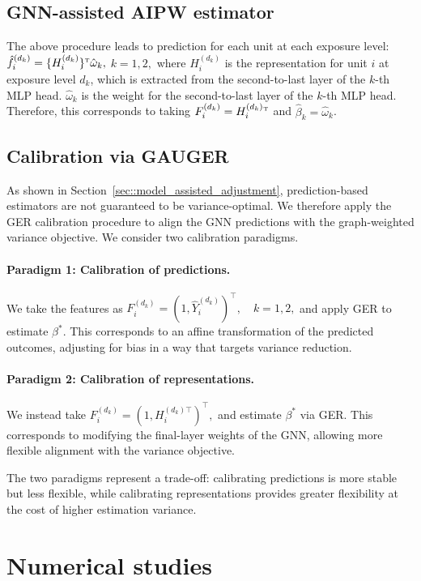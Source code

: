 \documentclass{article}
\theoremstyle{plain}
\theoremstyle{definition}
\theoremstyle{remark}
\def\T{{\textsc{t}}}
\begin{document}
\subsection{GNN-assisted AIPW estimator}
The above procedure leads to prediction for each unit at each exposure level: $\hat{f}_i^{(d_k)} = \{H_i^{(d_k)}\}{}^\T \hat{\omega}_k,$ $k=1,2,$ 
where $H_i^{(d_k)}$ is the representation for unit $i$ at exposure level $d_k$, which is extracted from the second-to-last layer of the $k$-th MLP head. $\hat{\omega}_k$ is the weight for the second-to-last layer of the $k$-th MLP head. Therefore, this corresponds to taking $F_i^{(d_k)} = H_i^{(d_k)}{}^\T$ and $\hat\beta_k = \hat{\omega}_k$.

\subsection{Calibration via GAUGER}

As shown in Section~\ref{sec::model_assisted_adjustment}, prediction-based estimators are not guaranteed to be variance-optimal. We therefore apply the GER calibration procedure to align the GNN predictions with the graph-weighted variance objective. We consider two calibration paradigms.

\paragraph{Paradigm 1: Calibration of predictions.}
We take the features as
$
F_i^{(d_k)} = (1, \hat{Y}_i^{(d_k)})^\top, \quad k=1,2,$
and apply GER to estimate $\beta^*$. This corresponds to an affine transformation of the predicted outcomes, adjusting for bias in a way that targets variance reduction.

\paragraph{Paradigm 2: Calibration of representations.}
We instead take
$
F_i^{(d_k)} = (1, H_i^{(d_k)\top})^\top,$
and estimate $\beta^*$ via GER. This corresponds to modifying the final-layer weights of the GNN, allowing more flexible alignment with the variance objective.

The two paradigms represent a trade-off: calibrating predictions is more stable but less flexible, while calibrating representations provides greater flexibility at the cost of higher estimation variance.

\section{Numerical studies}
\end{document}
